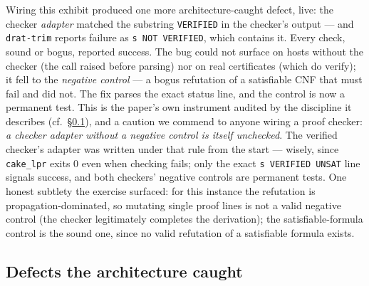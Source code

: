 Wiring this exhibit produced one more architecture-caught defect,
live: the checker \emph{adapter} matched the substring
\texttt{VERIFIED} in the checker's output --- and \texttt{drat-trim}
reports failure as \texttt{s NOT VERIFIED}, which contains it. Every
check, sound or bogus, reported success. The bug could not surface on
hosts without the checker (the call raised before parsing) nor on real
certificates (which do verify); it fell to the \emph{negative
control} --- a bogus refutation of a satisfiable CNF that must fail
and did not. The fix parses the exact status line, and the control is
now a permanent test. This is the paper's own instrument audited by
the discipline it describes (cf.\ \S\ref{sec:bugs}), and a caution we
commend to anyone wiring a proof checker: \emph{a checker adapter
without a negative control is itself unchecked}. The verified
checker's adapter was written under that rule from the start --- wisely,
since \texttt{cake\_lpr} exits 0 even when checking fails; only the
exact \texttt{s VERIFIED UNSAT} line signals success, and both
checkers' negative controls are permanent tests. One honest subtlety
the exercise surfaced: for this instance the refutation is
propagation-dominated, so mutating single proof lines is not a valid
negative control (the checker legitimately completes the derivation);
the satisfiable-formula control is the sound one, since no valid
refutation of a satisfiable formula exists.

\subsection{Defects the architecture caught}
\label{sec:bugs}



